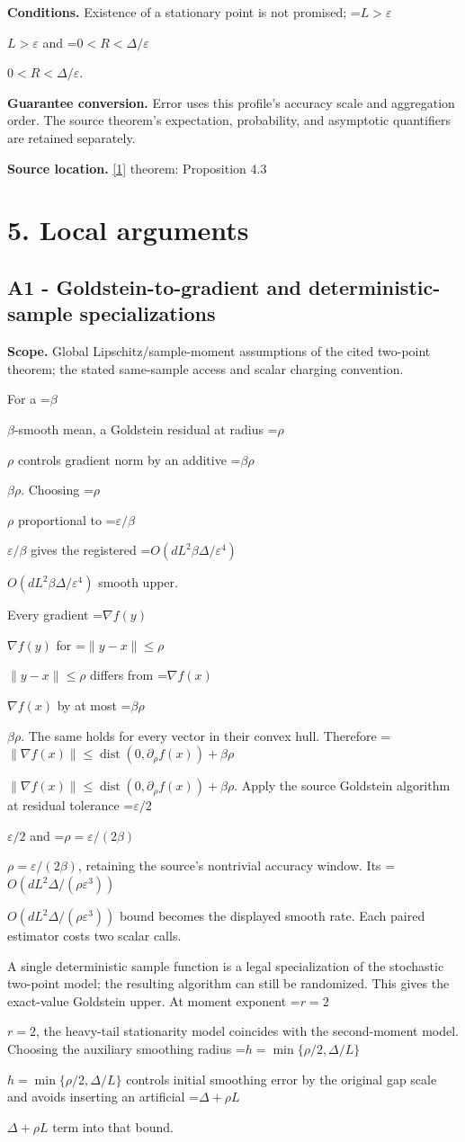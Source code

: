 \documentclass[10pt,a4paper]{article}
\newcommand{\AtlasMath}[1]{\par\begingroup\centering\setbox0=\hbox{$\displaystyle #1$}\ifdim\wd0>1.4\linewidth\typeout{ATLAS WIDE FORMULA: \the\wd0}\fi\ifdim\wd0>\linewidth\resizebox{\linewidth}{!}{\box0}\else\box0\fi\par\endgroup}
\newcommand{\AtlasInlineMath}[1]{\begingroup\setbox0=\hbox{$#1$}\ifdim\wd0>.4\linewidth\endgroup\AtlasMath{#1}\else\endgroup$#1$\fi}
\begin{document}
\textbf{Conditions.} Existence of a stationary point is not promised; \AtlasInlineMath{L>\varepsilon} and \AtlasInlineMath{0<R<\Delta/\varepsilon}.

\textbf{Guarantee conversion.} Error uses this profile's accuracy scale and aggregation order. The source theorem's expectation, probability, and asymptotic quantifiers are retained separately.

\textbf{Source location.} \href{https://arxiv.org/html/2610.00275v2}{[1]} theorem: Proposition 4.3

\section{5. Local arguments}
\subsection{A1 - Goldstein-to-gradient and deterministic-sample specializations}
\textbf{Scope.} Global Lipschitz/sample-moment assumptions of the cited two-point theorem; the stated same-sample access and scalar charging convention.

For a \AtlasInlineMath{\beta}-smooth mean, a Goldstein residual at radius \AtlasInlineMath{\rho} controls gradient norm by an additive \AtlasInlineMath{\beta\rho}. Choosing \AtlasInlineMath{\rho} proportional to \AtlasInlineMath{\varepsilon/\beta} gives the registered \AtlasInlineMath{O(dL^2\beta\Delta/\varepsilon^4)} smooth upper.

Every gradient \AtlasInlineMath{\nabla f(y)} for \AtlasInlineMath{\|y-x\|\le\rho} differs from \AtlasInlineMath{\nabla f(x)} by at most \AtlasInlineMath{\beta\rho}. The same holds for every vector in their convex hull. Therefore \AtlasInlineMath{\|\nabla f(x)\|\le\operatorname{dist}(0,\partial_\rho f(x))+\beta\rho}. Apply the source Goldstein algorithm at residual tolerance \AtlasInlineMath{\varepsilon/2} and \AtlasInlineMath{\rho=\varepsilon/(2\beta)}, retaining the source's nontrivial accuracy window. Its \AtlasInlineMath{O(dL^2\Delta/(\rho\varepsilon^3))} bound becomes the displayed smooth rate. Each paired estimator costs two scalar calls.

A single deterministic sample function is a legal specialization of the stochastic two-point model; the resulting algorithm can still be randomized. This gives the exact-value Goldstein upper. At moment exponent \AtlasInlineMath{r=2}, the heavy-tail stationarity model coincides with the second-moment model. Choosing the auxiliary smoothing radius \AtlasInlineMath{h=\min\{\rho/2,\Delta/L\}} controls initial smoothing error by the original gap scale and avoids inserting an artificial \AtlasInlineMath{\Delta+\rho L} term into that bound.
\end{document}
